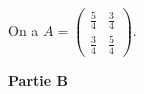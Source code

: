 \documentclass[10pt]{article}
\begin{document}
\begin{enumerate}
\begin{enumerate}
On a $A = \begin{pmatrix}\frac{5}{4}&\frac{3}{4}\\\frac{3}{4}&\frac{5}{4} \end{pmatrix}$.
	\end{enumerate}
\end{enumerate}

\bigskip
 
\textbf{Partie B}

\medskip
 
 
\end{document}
